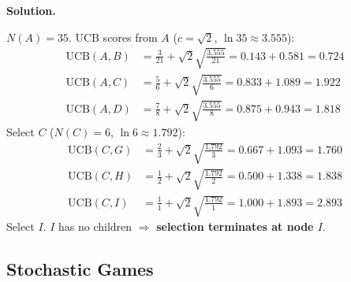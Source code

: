 \documentclass[12pt]{article}
\newenvironment{solution}{%
  \ifshowsolutions\begin{solutionbox}\noindent\textbf{\color{blue!70!black}Solution.}\quad\fi
  \ifshowsolutions\else\expandafter\comment\fi
}{%
  \ifshowsolutions\end{solutionbox}\fi
  \ifshowsolutions\else\expandafter\endcomment\fi
}
\begin{document}
\begin{enumerate}
\begin{enumerate}
  \begin{solution}
    $N(A)=35$. UCB scores from $A$ ($c=\sqrt{2}$, $\ln 35 \approx 3.555$):
    \begin{align*}
      \mathrm{UCB}(A,B)&=\tfrac{3}{21}+\sqrt{2}\sqrt{\tfrac{3.555}{21}}=0.143+0.581=0.724\\
      \mathrm{UCB}(A,C)&=\tfrac{5}{6}+\sqrt{2}\sqrt{\tfrac{3.555}{6}}=0.833+1.089=1.922\\
      \mathrm{UCB}(A,D)&=\tfrac{7}{8}+\sqrt{2}\sqrt{\tfrac{3.555}{8}}=0.875+0.943=1.818
    \end{align*}
    Select $C$ ($N(C)=6$, $\ln 6\approx1.792$):
    \begin{align*}
      \mathrm{UCB}(C,G)&=\tfrac{2}{3}+\sqrt{2}\sqrt{\tfrac{1.792}{3}}=0.667+1.093=1.760\\
      \mathrm{UCB}(C,H)&=\tfrac{1}{2}+\sqrt{2}\sqrt{\tfrac{1.792}{2}}=0.500+1.338=1.838\\
      \mathrm{UCB}(C,I)&=\tfrac{1}{1}+\sqrt{2}\sqrt{\tfrac{1.792}{1}}=1.000+1.893=2.893
    \end{align*}
    Select $I$. $I$ has no children $\Rightarrow$ \textbf{selection terminates at node $I$}.
  \end{solution}

\end{enumerate}

\clearpage

\subsection*{Stochastic Games}


\end{enumerate}
\end{document}
